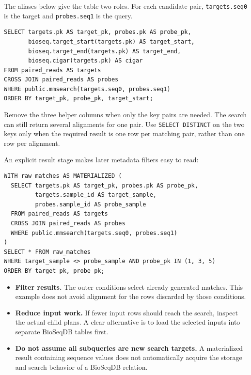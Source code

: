 The aliases below give the table two roles. For each candidate pair,
\texttt{targets.seq0} is the target and \texttt{probes.seq1} is the query.

\par\noindent\begin{minipage}{\linewidth}
\begin{lstlisting}[style=bioseq-appendix-sql]
SELECT targets.pk AS target_pk, probes.pk AS probe_pk,
       bioseq.target_start(targets.pk) AS target_start,
       bioseq.target_end(targets.pk) AS target_end,
       bioseq.cigar(targets.pk) AS cigar
FROM paired_reads AS targets
CROSS JOIN paired_reads AS probes
WHERE public.mmsearch(targets.seq0, probes.seq1)
ORDER BY target_pk, probe_pk, target_start;
\end{lstlisting}
\end{minipage}

Remove the three helper columns when only the key pairs are needed. The
search can still return several alignments for one pair. Use
\texttt{SELECT DISTINCT} on the two keys only when the required result is
one row per matching pair, rather than one row per alignment.

An explicit result stage makes later metadata filters easy to read:

\par\noindent\begin{minipage}{\linewidth}
\begin{lstlisting}[style=bioseq-appendix-sql]
WITH raw_matches AS MATERIALIZED (
  SELECT targets.pk AS target_pk, probes.pk AS probe_pk,
         targets.sample_id AS target_sample,
         probes.sample_id AS probe_sample
  FROM paired_reads AS targets
  CROSS JOIN paired_reads AS probes
  WHERE public.mmsearch(targets.seq0, probes.seq1)
)
SELECT * FROM raw_matches
WHERE target_sample <> probe_sample AND probe_pk IN (1, 3, 5)
ORDER BY target_pk, probe_pk;
\end{lstlisting}
\end{minipage}

\begin{itemize}
  \item \textbf{Filter results.} The outer conditions select already
    generated matches. This example does not avoid alignment for the rows
    discarded by those conditions.
  \item \textbf{Reduce input work.} If fewer input rows should reach the
    search, inspect the actual child plans. A clear alternative is to load
    the selected inputs into separate BioSeqDB tables first.
  \item \textbf{Do not assume all subqueries are new search targets.}
    A materialized result containing sequence values does not automatically
    acquire the storage and search behavior of a BioSeqDB relation.
\end{itemize}

